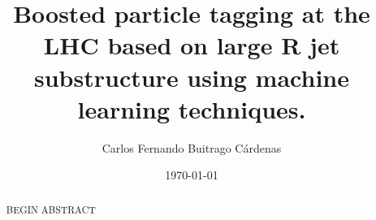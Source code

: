 \documentclass[11pt]{report} %
\begin{document}
\title{Boosted particle tagging at the LHC based on large R jet substructure using machine learning techniques.}
\author{Carlos Fernando Buitrago C\'ardenas}
\date{\today}
\maketitle
\thispagestyle{empty}

\begin{abstract}
\noindent BEGIN ABSTRACT
\end{abstract}

\setlength\cftaftertoctitleskip{10pt}
\renewcommand{\contentsname}{\LARGE\sc Table of Contents}

\strut\vspace{-50pt}
\tableofcontents
\thispagestyle{empty}

\pagebreak


\doublespacing





  













\newpage
\begin{small} %
\singlespacing %
\thispagestyle{empty} %
\end{small} %
\end{document}
